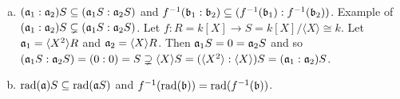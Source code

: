\begin{proposition}
\begin{enumerate}[(a)]
        \item $(\mathfrak{a}_1:\mathfrak{a}_2)S \subseteq (\mathfrak{a}_1S:\mathfrak{a}_2S)$ and $f^{-1}(\mathfrak{b}_1:\mathfrak{b}_2) \subseteq (f^{-1}(\mathfrak{b}_1):f^{-1}(\mathfrak{b}_2))$. Example of $(\mathfrak{a}_1:\mathfrak{a}_2)S \subsetneq (\mathfrak{a}_1S : \mathfrak{a}_2 S)$. Let $f: R = k[X] \to S = k[X]/\langle X \rangle \cong k$. Let $\mathfrak{a}_1 = \langle X^2 \rangle R$ and $\mathfrak{a}_2 = \langle X \rangle R$. Then $\mathfrak{a}_1 S = 0 = \mathfrak{a}_2 S$ and so $(\mathfrak{a}_1 S: \mathfrak{a}_2 S) = (0:0) = S \supsetneq \langle X \rangle S = (\langle X^2 \rangle: \langle X \rangle)S = (\mathfrak{a}_1:\mathfrak{a}_2)S$.
        \item $\operatorname{rad}(\mathfrak{a})S \subseteq \operatorname{rad}(\mathfrak{a} S)$ and $f^{-1}(\operatorname{rad}(\mathfrak{b})) = \operatorname{rad}(f^{-1}(\mathfrak{b}))$.
    \end{enumerate}
\end{proposition}

